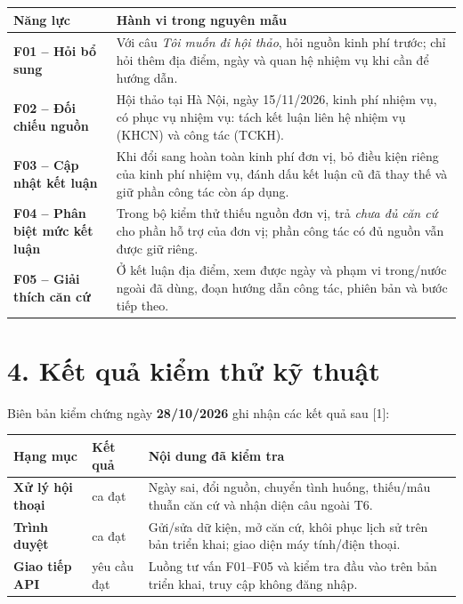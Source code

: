 \documentclass[12pt,a4paper]{article}
\begin{document}
\begin{tabularx}{\textwidth}{@{}>{\RaggedRight\arraybackslash\bfseries}p{36mm}>{\RaggedRight\arraybackslash}X@{}}
\toprule
Năng lực & \textbf{Hành vi trong nguyên mẫu}\\
\midrule
F01 -- Hỏi bổ sung &
Với câu \emph{Tôi muốn đi hội thảo}, hỏi nguồn kinh phí trước; chỉ hỏi thêm địa điểm, ngày và quan hệ nhiệm vụ khi cần để hướng dẫn.\\[3pt]
F02 -- Đối chiếu nguồn &
Hội thảo tại Hà Nội, ngày 15/11/2026, kinh phí nhiệm vụ, có phục vụ nhiệm vụ: tách kết luận liên hệ nhiệm vụ (KHCN) và công tác (TCKH).\\[3pt]
F03 -- Cập nhật kết luận &
Khi đổi sang hoàn toàn kinh phí đơn vị, bỏ điều kiện riêng của kinh phí nhiệm vụ, đánh dấu kết luận cũ đã thay thế và giữ phần công tác còn áp dụng.\\[3pt]
F04 -- Phân biệt mức kết luận &
Trong bộ kiểm thử thiếu nguồn đơn vị, trả \emph{chưa đủ căn cứ} cho phần hỗ trợ của đơn vị; phần công tác có đủ nguồn vẫn được giữ riêng.\\[3pt]
F05 -- Giải thích căn cứ &
Ở kết luận địa điểm, xem được ngày và phạm vi trong/nước ngoài đã dùng, đoạn hướng dẫn công tác, phiên bản và bước tiếp theo.\\
\bottomrule
\end{tabularx}

\section*{4. Kết quả kiểm thử kỹ thuật}
Biên bản kiểm chứng ngày \textbf{28/10/2026} ghi nhận các kết quả sau [1]:

\begin{tabularx}{\textwidth}{@{}>{\RaggedRight\arraybackslash\bfseries}p{35mm}>{\RaggedRight\arraybackslash}p{30mm}>{\RaggedRight\arraybackslash}X@{}}
\toprule
Hạng mục & \textbf{Kết quả} & \textbf{Nội dung đã kiểm tra}\\
\midrule
Xử lý hội thoại & 77 ca đạt & Ngày sai, đổi nguồn, chuyển tình huống, thiếu/mâu thuẫn căn cứ và nhận diện câu ngoài T6.\\[3pt]
Trình duyệt & 37 ca đạt & Gửi/sửa dữ kiện, mở căn cứ, khôi phục lịch sử trên bản triển khai; giao diện máy tính/điện thoại.\\[3pt]
Giao tiếp API & 23 yêu cầu đạt & Luồng tư vấn F01--F05 và kiểm tra đầu vào trên bản triển khai, truy cập không đăng nhập.\\
\bottomrule
\end{tabularx}
\end{document}
